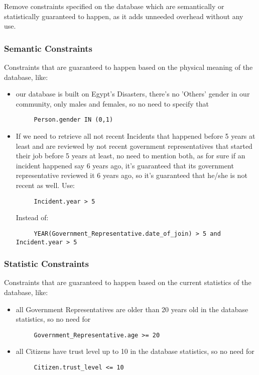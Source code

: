 Remove constraints specified on the database which are semantically or statistically guaranteed to happen, as it adds unneeded overhead without any use.
\subsubsection{Semantic Constraints}
Constraints that are guaranteed to happen based on the physical meaning of the database, like:
\begin{itemize}
     \item our database is built on Egypt's Disasters, there's no 'Others' gender in our community, only males and females, so no need to specify that
     \begin{verbatim}
     Person.gender IN (0,1)
     \end{verbatim}
     
     \item If we need to retrieve all not recent Incidents that happened before 5 years at least and are reviewed by not recent government representatives that started their job before 5 years at least, no need to mention both, as for sure if an incident happened say 6 years ago, it's guaranteed that its government representative reviewed it 6 years ago, so it's guaranteed that he/she is not recent as well.
     Use:
     \begin{verbatim}
     Incident.year > 5
     \end{verbatim}
     Instead of:
     \begin{verbatim}
     YEAR(Government_Representative.date_of_join) > 5 and Incident.year > 5
     \end{verbatim}
     
\end{itemize}



\subsubsection{Statistic Constraints}
Constraints that are guaranteed to happen based on the current statistics of the database, like:

\begin{itemize}
     \item all Government Representatives are older than 20 years old in the database statistics, so no need for
     \begin{verbatim}
     Government_Representative.age >= 20
     \end{verbatim}
     
     \item all Citizens have trust level up to 10 in the database statistics, so no need for
     \begin{verbatim}
     Citizen.trust_level <= 10
     \end{verbatim}
     
\end{itemize}